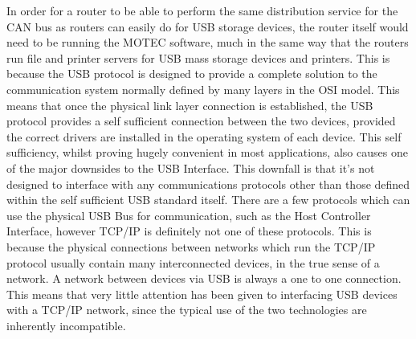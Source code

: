 In order for a router to be able to perform the same distribution service for the CAN bus as routers can easily do for USB storage devices, the router itself would need to be running the MOTEC software, much in the same way that the routers run file and printer servers for USB mass storage devices and printers. This is because the USB protocol is designed to provide a complete solution to the communication system normally defined by many layers in the OSI model\cite{zimmermann1980osi}. This means that once the physical link layer connection is established, the USB protocol provides a self sufficient connection between the two devices, provided the correct drivers are installed in the operating system of each device\cite{MAN_USB}. This self sufficiency, whilst proving hugely convenient in most applications, also causes one of the major downsides to the USB Interface. This downfall is that it's not designed to interface with any communications protocols other than those defined within the self sufficient USB standard itself. There are a few protocols which can use the physical USB Bus for communication, such as the Host Controller Interface\cite{MAN_HCI}, however TCP/IP is definitely not one of these protocols\cite{doyle2005routing}. This is because the physical connections between networks which run the TCP/IP protocol usually contain many interconnected devices, in the true sense of a network. A network between devices via USB is always a one to one connection. This means that very little attention has been given to interfacing USB devices with a TCP/IP network, since the typical use of the two technologies are inherently incompatible.

